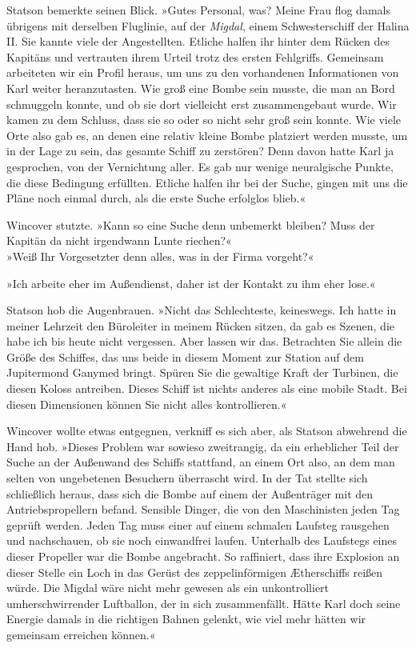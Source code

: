 Statson bemerkte seinen Blick. »Gutes Personal, was? Meine Frau
flog damals übrigens mit derselben Fluglinie, auf der
\emph{Migdal}, einem Schwesterschiff der Halina II. Sie kannte
viele der Angestellten. Etliche halfen ihr hinter dem Rücken des
Kapitäns und vertrauten ihrem Urteil trotz des ersten Fehlgriffs.
Gemeinsam arbeiteten wir ein Profil heraus, um uns zu den
vorhandenen Informationen von Karl weiter heranzutasten. Wie groß
eine Bombe sein musste, die man an Bord schmuggeln konnte, und ob
sie dort vielleicht erst zusammengebaut wurde. Wir kamen zu dem
Schluss, dass sie so oder so nicht sehr groß sein konnte. Wie viele
Orte also gab es, an denen eine relativ kleine Bombe platziert
werden musste, um in der Lage zu sein, das gesamte Schiff zu
zerstören? Denn davon hatte Karl ja gesprochen, von der Vernichtung
aller. Es gab nur wenige neuralgische Punkte, die diese Bedingung
erfüllten. Etliche halfen ihr bei der Suche, gingen mit uns die
Pläne noch einmal durch, als die erste Suche erfolglos blieb.«

Wincover stutzte. »Kann so eine Suche denn unbemerkt bleiben? Muss
der Kapitän da nicht irgendwann Lunte riechen?«\\ »Weiß Ihr
Vorgesetzter denn alles, was in der Firma vorgeht?«

»Ich arbeite eher im Außendienst, daher ist der Kontakt zu ihm eher
lose.«

Statson hob die Augenbrauen. »Nicht das Schlechteste, keineswegs.
Ich hatte in meiner Lehrzeit den Büroleiter in meinem Rücken
sitzen, da gab es Szenen, die habe ich bis heute nicht vergessen.
Aber lassen wir das. Betrachten Sie allein die Größe des Schiffes,
das uns beide in diesem Moment zur Station auf dem Jupitermond
Ganymed bringt. Spüren Sie die gewaltige Kraft der Turbinen, die
diesen Koloss antreiben. Dieses Schiff ist nichts anderes als eine
mobile Stadt. Bei diesen Dimensionen können Sie nicht alles
kontrollieren.«

Wincover wollte etwas entgegnen, verkniff es sich aber, als Statson
abwehrend die Hand hob. »Dieses Problem war sowieso zweitrangig, da
ein erheblicher Teil der Suche an der Außenwand des Schiffs
stattfand, an einem Ort also, an dem man selten von ungebetenen
Besuchern überrascht wird. In der Tat stellte sich schließlich
heraus, dass sich die Bombe auf einem der Außenträger mit den
Antriebspropellern befand. Sensible Dinger, die von den
Maschinisten jeden Tag geprüft werden. Jeden Tag muss einer auf
einem schmalen Laufsteg rausgehen und nachschauen, ob sie noch
einwandfrei laufen. Unterhalb des Laufstegs eines dieser Propeller
war die Bombe angebracht. So raffiniert, dass ihre Explosion an
dieser Stelle ein Loch in das Gerüst des zeppelinförmigen
Ætherschiffs reißen würde. Die Migdal wäre nicht mehr gewesen als
ein unkontrolliert umherschwirrender Luftballon, der in sich
zusammenfällt. Hätte Karl doch seine Energie damals in die
richtigen Bahnen gelenkt, wie viel mehr hätten wir gemeinsam
erreichen können.«

